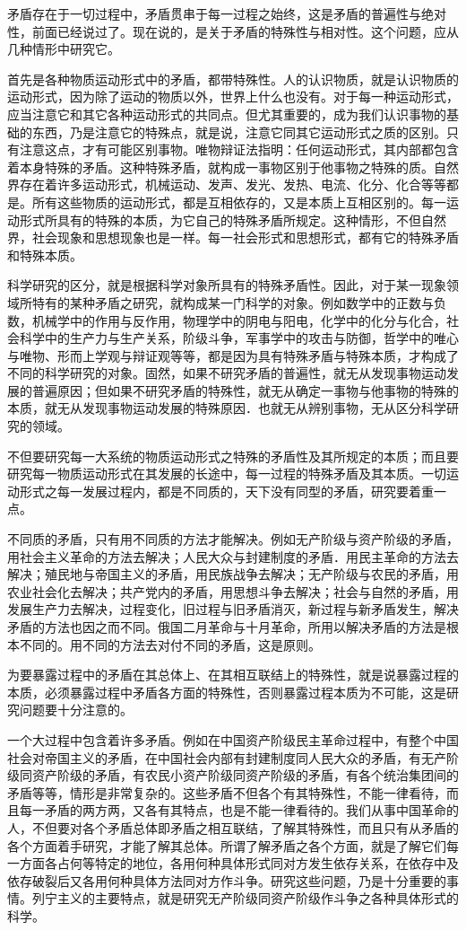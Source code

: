 矛盾存在于一切过程中，矛盾贯串于每一过程之始终，这是矛盾的普遍性与绝对性，前面已经说过了。现在说的，是关于矛盾的特殊性与相对性。这个问题，应从几种情形中研究它。

首先是各种物质运动形式中的矛盾，都带特殊性。人的认识物质，就是认识物质的运动形式，因为除了运动的物质以外，世界上什么也没有。对于每一种运动形式，应当注意它和其它各种运动形式的共同点。但尤其重要的，成为我们认识事物的基础的东西，乃是注意它的特殊点，就是说，注意它同其它运动形式之质的区别。只有注意这点，才有可能区别事物。唯物辩证法指明：任何运动形式，其内部都包含着本身特殊的矛盾。这种特殊矛盾，就构成一事物区别于他事物之特殊的质。自然界存在着许多运动形式，机械运动、发声、发光、发热、电流、化分、化合等等都是。所有这些物质的运动形式，都是互相依存的，又是本质上互相区别的。每一运动形式所具有的特殊的本质，为它自己的特殊矛盾所规定。这种情形，不但自然界，社会现象和思想现象也是一样。每一社会形式和思想形式，都有它的特殊矛盾和特殊本质。

科学研究的区分，就是根据科学对象所具有的特殊矛盾性。因此，对于某一现象领域所特有的某种矛盾之研究，就构成某一门科学的对象。例如数学中的正数与负数，机械学中的作用与反作用，物理学中的阴电与阳电，化学中的化分与化合，社会科学中的生产力与生产关系，阶级斗争，军事学中的攻击与防御，哲学中的唯心与唯物、形而上学观与辩证观等等，都是因为具有特殊矛盾与特殊本质，才构成了不同的科学研究的对象。固然，如果不研究矛盾的普遍性，就无从发现事物运动发展的普遍原因；但如果不研究矛盾的特殊性，就无从确定一事物与他事物的特殊的本质，就无从发现事物运动发展的特殊原因．也就无从辨别事物，无从区分科学研究的领域。

不但要研究每一大系统的物质运动形式之特殊的矛盾性及其所规定的本质；而且要研究每一物质运动形式在其发展的长途中，每一过程的特殊矛盾及其本质。一切运动形式之每一发展过程内，都是不同质的，天下没有同型的矛盾，研究要着重一点。

不同质的矛盾，只有用不同质的方法才能解决。例如无产阶级与资产阶级的矛盾，用社会主义革命的方法去解决；人民大众与封建制度的矛盾．用民主革命的方法去解决；殖民地与帝国主义的矛盾，用民族战争去解决；无产阶级与农民的矛盾，用农业社会化去解决；共产党内的矛盾，用思想斗争去解决；社会与自然的矛盾，用发展生产力去解决，过程变化，旧过程与旧矛盾消灭，新过程与新矛盾发生，解决矛盾的方法也因之而不同。俄国二月革命与十月革命，所用以解决矛盾的方法是根本不同的。用不同的方法去对付不同的矛盾，这是原则。

为要暴露过程中的矛盾在其总体上、在其相互联结上的特殊性，就是说暴露过程的本质，必须暴露过程中矛盾各方面的特殊性，否则暴露过程本质为不可能，这是研究问题要十分注意的。

一个大过程中包含着许多矛盾。例如在中国资产阶级民主革命过程中，有整个中国社会对帝国主义的矛盾，在中国社会内部有封建制度同人民大众的矛盾，有无产阶级同资产阶级的矛盾，有农民小资产阶级同资产阶级的矛盾，有各个统治集团间的矛盾等等，情形是非常复杂的。这些矛盾不但各个有其特殊性，不能一律看待，而且每一矛盾的两方两，又各有其特点，也是不能一律看待的。我们从事中国革命的人，不但要对各个矛盾总体即矛盾之相互联结，了解其特殊性，而且只有从矛盾的各个方面着手研究，才能了解其总体。所谓了解矛盾之各个方面，就是了解它们每一方面各占何等特定的地位，各用何种具体形式同对方发生依存关系，在依存中及依存破裂后又各用何种具体方法同对方作斗争。研究这些问题，乃是十分重要的事情。列宁主义的主要特点，就是研究无产阶级同资产阶级作斗争之各种具体形式的科学。


